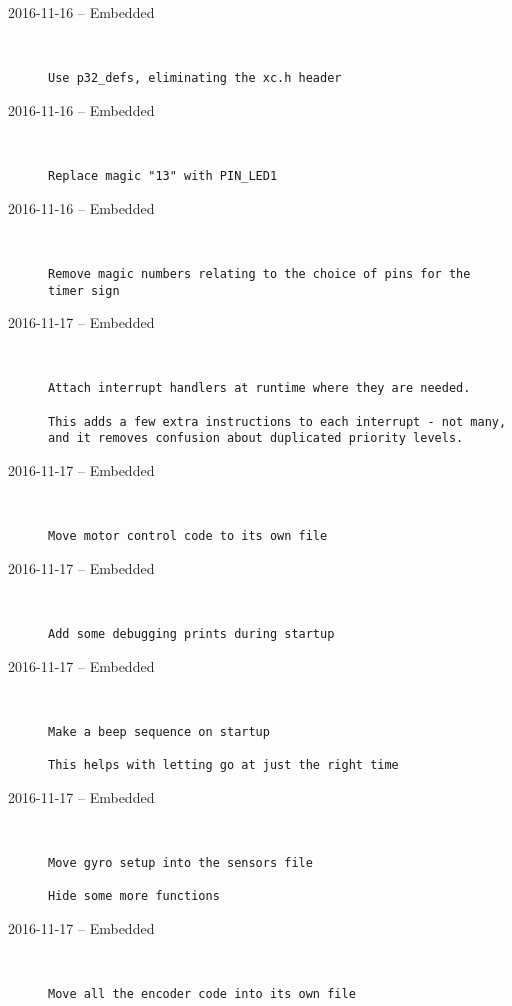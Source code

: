 \begin{description}
  \item[2016-11-16 -- Embedded] \hfill \
\begin{lstlisting}
Use p32_defs, eliminating the xc.h header
\end{lstlisting}


  \item[2016-11-16 -- Embedded] \hfill \
\begin{lstlisting}
Replace magic "13" with PIN_LED1
\end{lstlisting}


  \item[2016-11-16 -- Embedded] \hfill \
\begin{lstlisting}
Remove magic numbers relating to the choice of pins for the timer sign
\end{lstlisting}


  \item[2016-11-17 -- Embedded] \hfill \
\begin{lstlisting}
Attach interrupt handlers at runtime where they are needed.

This adds a few extra instructions to each interrupt - not many, and it removes confusion about duplicated priority levels.
\end{lstlisting}


  \item[2016-11-17 -- Embedded] \hfill \
\begin{lstlisting}
Move motor control code to its own file
\end{lstlisting}


  \item[2016-11-17 -- Embedded] \hfill \
\begin{lstlisting}
Add some debugging prints during startup
\end{lstlisting}


  \item[2016-11-17 -- Embedded] \hfill \
\begin{lstlisting}
Make a beep sequence on startup

This helps with letting go at just the right time
\end{lstlisting}


  \item[2016-11-17 -- Embedded] \hfill \
\begin{lstlisting}
Move gyro setup into the sensors file

Hide some more functions
\end{lstlisting}


  \item[2016-11-17 -- Embedded] \hfill \
\begin{lstlisting}
Move all the encoder code into its own file
\end{lstlisting}



\end{description}
